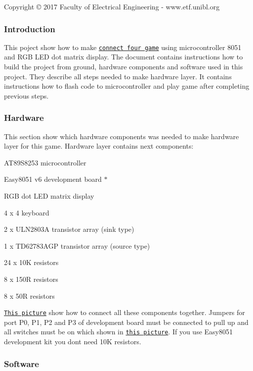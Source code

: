 Copyright © 2017 Faculty of Electrical Engineering -\/ www.\+etf.\+unibl.\+org

\subsubsection*{Introduction}

This poject show how to make \href{https://en.wikipedia.org/wiki/Connect_Four}{\tt connect four game} using microcontroller 8051 and R\+GB L\+ED dot matrix display. The document contains instructions how to build the project from ground, hardware components and software used in this project. They describe all steps needed to make hardware layer. It contains instructions how to flash code to microcontroller and play game after completing previous steps.

\subsubsection*{Hardware}

This section show which hardware components was needed to make hardware layer for this game. Hardware layer contains next components\+:
\begin{DoxyItemize}
\item A\+T89\+S8253 microcontroller
\item Easy8051 v6 development board $\ast$
\item R\+GB dot L\+ED matrix display
\item 4 x 4 keyboard
\item 2 x U\+L\+N2803A transistor array (sink type)
\item 1 x T\+D62783\+A\+GP transistor array (source type)
\item 24 x 10K resistors
\item 8 x 150R resistors
\item 8 x 50R resistors
\end{DoxyItemize}

\href{resources/images/connect_four_scheme.jpg}{\tt This picture} show how to connect all these components together. Jumpers for port P0, P1, P2 and P3 of development board must be connected to pull up and all switches must be on which shown in \href{resources/images/dev_board_port_switches.jpg}{\tt this picture}. If you use Easy8051 development kit you don\textquotesingle{}t need 10K resistors.

\subsubsection*{Software}

